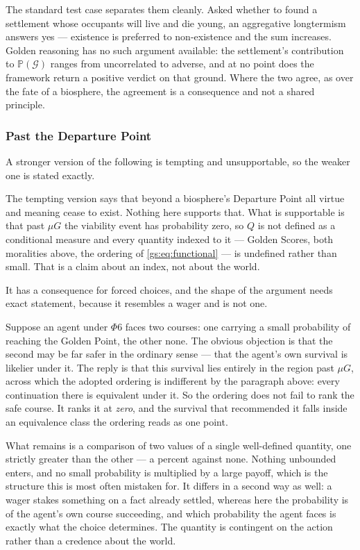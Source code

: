 \documentclass[11pt]{article}
\numberwithin{equation}{section}
\theoremstyle{plain}
\theoremstyle{definition}
\theoremstyle{remark}
\newcommand{\PP}{\mathbb{P}}
\begin{document}
The standard test case separates them cleanly. Asked whether to found a
settlement whose occupants will live and die young, an aggregative
longtermism answers yes --- existence is preferred to non-existence and
the sum increases. Golden reasoning has no such argument available: the
settlement's contribution to $\PP(\mathcal G)$ ranges from uncorrelated
to adverse, and at no point does the framework return a positive verdict
on that ground. Where the two agree, as over the fate of a biosphere,
the agreement is a consequence and not a shared principle.

\subsubsection{Past the Departure Point}\label{gs:ssub:departric}

A stronger version of the following is tempting and unsupportable, so the
weaker one is stated exactly.

The tempting version says that beyond a biosphere's Departure Point all
virtue and meaning cease to exist. Nothing here supports that. What is
supportable is that past $\mu G$ the viability event has probability
zero, so $Q$ is not defined as a conditional measure and every quantity
indexed to it --- Golden Scores, both moralities above, the ordering of
\eqref{gs:eq:functional} --- is undefined rather than small. That is a
claim about an index, not about the world.

It has a consequence for forced choices, and the shape of the argument
needs exact statement, because it resembles a wager and is not one.

Suppose an agent under $\Phi6$ faces two courses: one carrying a small
probability of reaching the Golden Point, the other none. The obvious
objection is that the second may be far safer in the ordinary sense ---
that the agent's own survival is likelier under it. The reply is that
this survival lies entirely in the region past $\mu G$, across which the
adopted ordering is indifferent by the paragraph above: every
continuation there is equivalent under it. So the ordering does not fail
to rank the safe course. It ranks it at \emph{zero}, and the survival
that recommended it falls inside an equivalence class the ordering reads
as one point.

What remains is a comparison of two values of a single well-defined
quantity, one strictly greater than the other --- a percent against
none. Nothing unbounded enters, and no small probability is multiplied
by a large payoff, which is the structure this is most often mistaken
for. It differs in a second way as well: a wager stakes something on a
fact already settled, whereas here the probability is of the agent's own
course succeeding, and which probability the agent faces is exactly what
the choice determines. The quantity is contingent on the action rather
than a credence about the world.
\end{document}
